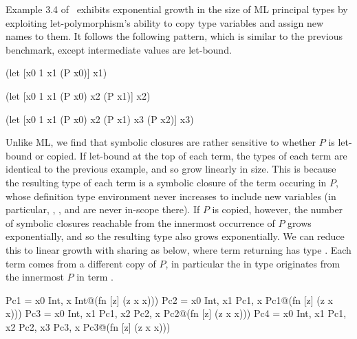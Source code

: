 \documentclass[11pt]{iuthesis}
\begin{document}
Example 3.4 of~\cite{kanellakis1989polymorphic}
exhibits exponential growth in the size of ML principal types by exploiting
let-polymorphism's ability to copy type variables and assign new names to them.
It follows the following pattern, which is similar to the previous benchmark, except
intermediate values are let-bound.

\begin{minipage}[t]{0.3\linewidth}
\begin{cljlisting}
(let [x0 1
      x1 (P x0)]
  x1)
\end{cljlisting}
\end{minipage}
%
\begin{minipage}[t]{0.3\linewidth}
\begin{cljlisting}
(let [x0 1
      x1 (P x0)
      x2 (P x1)]
  x2)
\end{cljlisting}
\end{minipage}
%
\begin{minipage}[t]{0.3\linewidth}
\begin{cljlisting}
(let [x0 1
      x1 (P x0)
      x2 (P x1)
      x3 (P x2)]
  x3)
\end{cljlisting}
\end{minipage}

Unlike ML, we find that symbolic closures are rather sensitive to whether $P$
is let-bound or copied.
If let-bound at the top of each term, the types of each term are
identical to the previous example, and so grow linearly in size.
This is because the resulting type of each term is a symbolic closure of the
 term occuring in $P$, whose definition type environment
never increases to include new variables (in particular, , , and 
are never in-scope there).
If $P$ is copied, however, the number of symbolic closures reachable from
the innermost occurrence of $P$ grows exponentially, and so the resulting type also
grows exponentially.
We can reduce this to linear growth with sharing as below, where term returning  has type .
Each  term comes from a different copy of $P$, in particular
the  in type  originates from the innermost $P$ in term .

\begin{cljlisting}
Pc1 = {x0 Int,                         x Int}@(fn [z] (z x x)))
Pc2 = {x0 Int, x1 Pc1,                 x Pc1}@(fn [z] (z x x)))
Pc3 = {x0 Int, x1 Pc1, x2 Pc2,         x Pc2}@(fn [z] (z x x)))
Pc4 = {x0 Int, x1 Pc1, x2 Pc2, x3 Pc3, x Pc3}@(fn [z] (z x x)))
\end{cljlisting}
\end{document}
